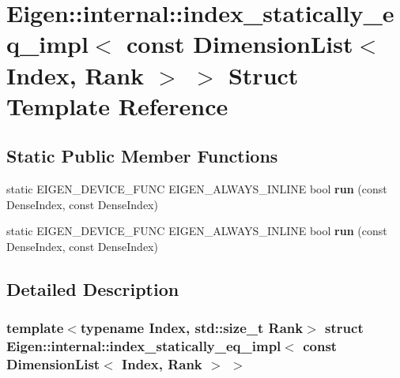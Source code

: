 \hypertarget{struct_eigen_1_1internal_1_1index__statically__eq__impl_3_01const_01_dimension_list_3_01_index_00_01_rank_01_4_01_4}{}\section{Eigen\+:\+:internal\+:\+:index\+\_\+statically\+\_\+eq\+\_\+impl$<$ const Dimension\+List$<$ Index, Rank $>$ $>$ Struct Template Reference}
\label{struct_eigen_1_1internal_1_1index__statically__eq__impl_3_01const_01_dimension_list_3_01_index_00_01_rank_01_4_01_4}
\subsection*{Static Public Member Functions}
\begin{DoxyCompactItemize}
\item 
\mbox{\label{struct_eigen_1_1internal_1_1index__statically__eq__impl_3_01const_01_dimension_list_3_01_index_00_01_rank_01_4_01_4_a205ff863c56168d80115bda62eb24af9}} 
static E\+I\+G\+E\+N\+\_\+\+D\+E\+V\+I\+C\+E\+\_\+\+F\+U\+NC E\+I\+G\+E\+N\+\_\+\+A\+L\+W\+A\+Y\+S\+\_\+\+I\+N\+L\+I\+NE bool {\bfseries run} (const Dense\+Index, const Dense\+Index)
\item 
\mbox{\label{struct_eigen_1_1internal_1_1index__statically__eq__impl_3_01const_01_dimension_list_3_01_index_00_01_rank_01_4_01_4_a205ff863c56168d80115bda62eb24af9}} 
static E\+I\+G\+E\+N\+\_\+\+D\+E\+V\+I\+C\+E\+\_\+\+F\+U\+NC E\+I\+G\+E\+N\+\_\+\+A\+L\+W\+A\+Y\+S\+\_\+\+I\+N\+L\+I\+NE bool {\bfseries run} (const Dense\+Index, const Dense\+Index)
\end{DoxyCompactItemize}


\subsection{Detailed Description}
\subsubsection*{template$<$typename Index, std\+::size\+\_\+t Rank$>$\newline
struct Eigen\+::internal\+::index\+\_\+statically\+\_\+eq\+\_\+impl$<$ const Dimension\+List$<$ Index, Rank $>$ $>$}



